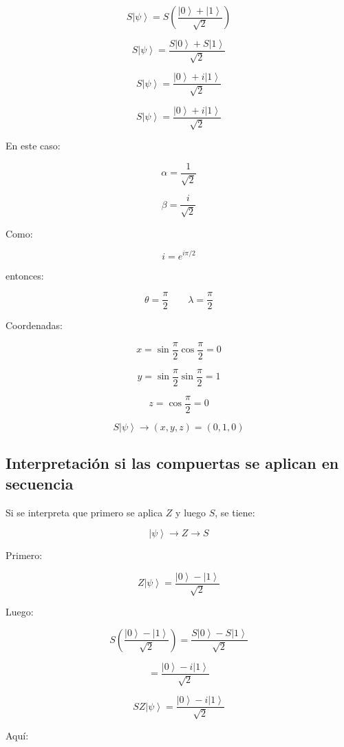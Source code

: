 \documentclass[12pt,a4paper]{article}
\newcommand{\ket}[1]{\left|#1\right\rangle}
\begin{document}
\[
S\ket{\psi}
=
S\left(
\frac{\ket{0}+\ket{1}}{\sqrt{2}}
\right)
\]

\[
S\ket{\psi}
=
\frac{S\ket{0}+S\ket{1}}{\sqrt{2}}
\]

\[
S\ket{\psi}
=
\frac{\ket{0}+i\ket{1}}{\sqrt{2}}
\]

\begin{resultado}
\[
\boxed{
S\ket{\psi}
=
\frac{\ket{0}+i\ket{1}}{\sqrt{2}}
}
\]
\end{resultado}

En este caso:

\[
\alpha=\frac{1}{\sqrt{2}}
\]

\[
\beta=\frac{i}{\sqrt{2}}
\]

Como:

\[
i=e^{i\pi/2}
\]

entonces:

\[
\theta=\frac{\pi}{2}
\qquad
\lambda=\frac{\pi}{2}
\]

Coordenadas:

\[
x=\sin\frac{\pi}{2}\cos\frac{\pi}{2}=0
\]

\[
y=\sin\frac{\pi}{2}\sin\frac{\pi}{2}=1
\]

\[
z=\cos\frac{\pi}{2}=0
\]

\begin{resultado}
\[
\boxed{S\ket{\psi}\rightarrow(x,y,z)=(0,1,0)}
\]
\end{resultado}

\subsection{Interpretación si las compuertas se aplican en secuencia}

Si se interpreta que primero se aplica \(Z\) y luego \(S\), se tiene:

\[
\ket{\psi}\rightarrow Z\rightarrow S
\]

Primero:

\[
Z\ket{\psi}=
\frac{\ket{0}-\ket{1}}{\sqrt{2}}
\]

Luego:

\[
S\left(
\frac{\ket{0}-\ket{1}}{\sqrt{2}}
\right)
=
\frac{S\ket{0}-S\ket{1}}{\sqrt{2}}
\]

\[
=
\frac{\ket{0}-i\ket{1}}{\sqrt{2}}
\]

\begin{resultado}
\[
\boxed{
SZ\ket{\psi}
=
\frac{\ket{0}-i\ket{1}}{\sqrt{2}}
}
\]
\end{resultado}

Aquí:
\end{document}
